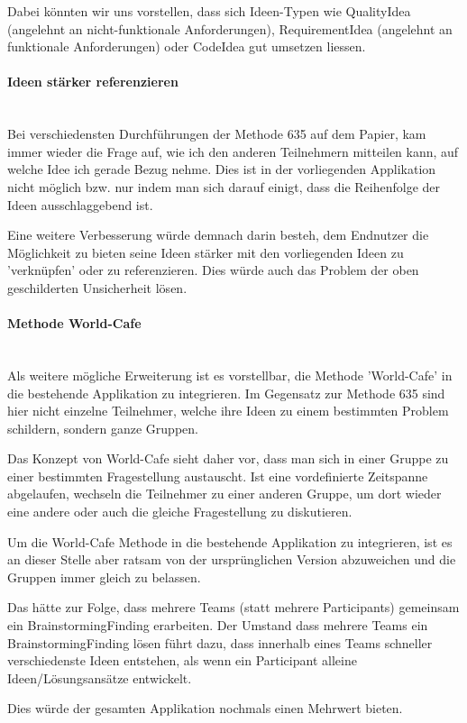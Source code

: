 Dabei könnten wir uns vorstellen, dass sich Ideen-Typen wie QualityIdea (angelehnt an nicht-funktionale Anforderungen), RequirementIdea (angelehnt an funktionale Anforderungen)  oder CodeIdea gut umsetzen liessen.

\paragraph*{Ideen stärker referenzieren}~\\
Bei verschiedensten Durchführungen der Methode 635 auf dem Papier, kam immer wieder die Frage auf, wie ich den anderen Teilnehmern mitteilen kann, auf welche Idee ich gerade Bezug nehme. Dies ist in der vorliegenden Applikation nicht möglich bzw. nur indem man sich darauf einigt, dass die Reihenfolge der Ideen ausschlaggebend ist.

Eine weitere Verbesserung würde demnach darin besteh, dem Endnutzer die Möglichkeit zu bieten seine Ideen stärker mit den vorliegenden Ideen zu 'verknüpfen' oder zu referenzieren. Dies würde auch das Problem der oben geschilderten Unsicherheit lösen.

\paragraph*{Methode World-Cafe}~\\
Als weitere mögliche Erweiterung ist es vorstellbar, die Methode 'World-Cafe' \cite{world-cafe} in die bestehende Applikation zu integrieren. Im Gegensatz zur Methode 635 sind hier nicht einzelne Teilnehmer, welche ihre Ideen zu einem bestimmten Problem schildern, sondern ganze Gruppen.

Das Konzept von World-Cafe sieht daher vor, dass man sich in einer Gruppe zu einer bestimmten Fragestellung austauscht. Ist eine vordefinierte Zeitspanne abgelaufen, wechseln die Teilnehmer zu einer anderen Gruppe, um dort wieder eine andere oder auch die gleiche Fragestellung zu diskutieren. 

Um die World-Cafe Methode in die bestehende Applikation zu integrieren, ist es an dieser Stelle aber ratsam von der ursprünglichen Version abzuweichen und die Gruppen immer gleich zu belassen. 

Das hätte zur Folge, dass mehrere Teams (statt mehrere Participants) gemeinsam ein BrainstormingFinding erarbeiten. Der Umstand dass mehrere Teams ein BrainstormingFinding lösen führt dazu, dass innerhalb eines Teams schneller verschiedenste Ideen entstehen, als wenn ein Participant alleine Ideen/Lösungsansätze entwickelt. 

Dies würde der gesamten Applikation nochmals einen Mehrwert bieten. 
